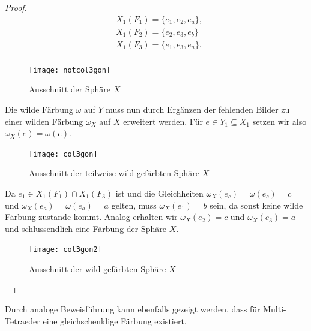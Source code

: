 \documentclass[12pt,titlepage,twoside,cleardoublepage]{article}
\theoremstyle{nummermitklammern}
\numberwithin{equation}{section}
\begin{document}
\begin{proof}
\begin{align*}
&X_1(F_1)=\{e_1,e_2,e_a\},\\
&X_1(F_2)=\{e_2,e_3,e_b\}\\
& X_1(F_3)=\{e_1,e_3,e_a\}.\\
\end{align*}
\begin{figure}[H]
\begin{center}
\texttt{[image: notcol3gon]}
\end{center}
\caption{Ausschnitt der Sphäre $X$}
\end{figure}
Die wilde Färbung $\omega$ auf $Y$ muss nun durch Ergänzen der fehlenden Bilder zu einer wilden Färbung $\omega_X$ auf $X$ erweitert werden. Für $e\in Y_1\subseteq X_1$ setzen wir  also $\omega_X(e)=\omega(e).$  
\begin{figure}[H]
\begin{center}
\texttt{[image: col3gon]}
\end{center}
\caption{Ausschnitt der teilweise wild-gefärbten Sphäre $X$}
\end{figure}
Da $e_1 \in X_1(F_1)\cap X_1(F_3)$ ist und die Gleichheiten $\omega_X(e_c)=\omega(e_c)=c$ und $\omega_X(e_a)=\omega(e_a)=a$ gelten, muss $\omega_X(e_1)=b$ sein, da sonst keine wilde Färbung zustande kommt. Analog erhalten wir $\omega_X(e_2)=c$ und $\omega_X(e_3)=a$ und schlussendlich eine Färbung der Sphäre $X$.
\begin{figure}[H]
\begin{center}
\texttt{[image: col3gon2]}
\end{center}
\caption{Ausschnitt der wild-gefärbten Sphäre $X$}
\end{figure}
\end{proof}
Durch analoge Beweisführung kann ebenfalls gezeigt werden, dass für Multi-Tetraeder eine gleichschenklige Färbung existiert. 
\end{document}
